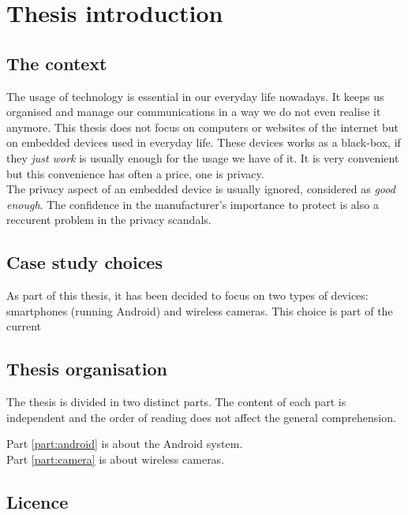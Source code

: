 \chapter{Thesis introduction}

\section{The context}

The usage of technology is essential in our everyday life nowadays.
It keeps us organised and manage our communications in a way we do not even realise it anymore.
This thesis does not focus on computers or websites of the internet but on embedded devices used in everyday life.
These devices works as a black-box, if they \emph{just work} is usually enough for the usage we have of it.
It is very convenient but this convenience has often a price, one is privacy.\\

The privacy aspect of an embedded device is usually ignored, considered as \emph{good enough}.
The confidence in the manufacturer's importance to protect is also a reccurent problem in the privacy scandals.\\

\section{Case study choices}

As part of this thesis, it has been decided to focus on two types of devices: smartphones (running Android) and wireless cameras.
This choice is part of the current 

\section{Thesis organisation}

The thesis is divided in two distinct parts.
The content of each part is independent and the order of reading does not affect the general comprehension.

Part \ref{part:android} is about the Android system.\\

Part \ref{part:camera} is about wireless cameras.

\section{Licence}


